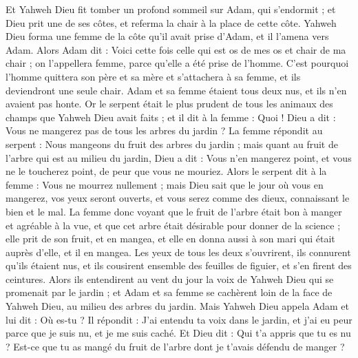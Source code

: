\begin{multicols}{2}
Et Yahweh Dieu fit tomber un profond sommeil sur Adam, qui s'endormit ; et Dieu prit une de ses côtes, et referma la chair à la place de cette côte.
Yahweh Dieu forma une femme de la côte qu'il avait prise d'Adam, et il l’amena vers Adam.
Alors Adam dit : Voici cette fois celle qui est os de mes os et chair de ma chair ; on l’appellera femme, parce qu'elle a été prise de l'homme.
C'est pourquoi l'homme quittera son père et sa mère et s’attachera à sa femme, et ils deviendront une seule chair.
Adam et sa femme étaient tous deux nus, et ils n’en avaient pas honte.
\VerseOne{}Or le serpent était le plus prudent de tous les animaux des champs que Yahweh Dieu avait faits ; et il dit à la femme : Quoi ! Dieu a dit : Vous ne mangerez pas de tous les arbres du jardin ?
La femme répondit au serpent : Nous mangeons du fruit des arbres du jardin ;
mais quant au fruit de l'arbre qui est au milieu du jardin, Dieu a dit : Vous n'en mangerez point, et vous ne le toucherez point, de peur que vous ne mouriez.
Alors le serpent dit à la femme : Vous ne mourrez nullement ;
mais Dieu sait que le jour où vous en mangerez, vos yeux seront ouverts, et vous serez comme des dieux, connaissant le bien et le mal.
La femme donc voyant que le fruit de l'arbre était bon à manger et agréable à la vue, et que cet arbre était désirable pour donner de la science ; elle prit de son fruit, et en mangea, et elle en donna aussi à son mari qui était auprès d’elle, et il en mangea.
Les yeux de tous les deux s’ouvrirent, ils connurent qu'ils étaient nus, et ils cousirent ensemble des feuilles de figuier, et s'en firent des ceintures.
Alors ils entendirent au vent du jour la voix de Yahweh Dieu qui se promenait par le jardin ; et Adam et sa femme se cachèrent loin de la face de Yahweh Dieu, au milieu des arbres du jardin.
Mais Yahweh Dieu appela Adam et lui dit : Où es-tu ?
Il répondit : J'ai entendu ta voix dans le jardin, et j'ai eu peur parce que je suis nu, et je me suis caché.
Et Dieu dit : Qui t'a appris que tu es nu ? Est-ce que tu as mangé du fruit de l'arbre dont je t'avais défendu de manger ?

\end{multicols}

